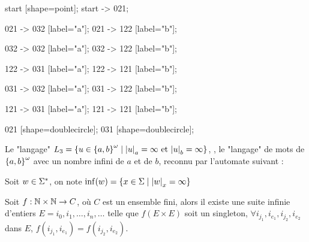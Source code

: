 \begin{exemple}
\begin{itemize}
\begin{automata}
{				      start [shape=point];
				      start -> 021;

				      021 -> 032 [label="a"];
				      021 -> 122 [label="b"];

				      032 -> 032 [label="a"];
				      032 -> 122 [label="b"];


				      122 -> 031 [label="a"];
				      122 -> 121 [label="b"];


				      031 -> 032 [label="a"];
				      031 -> 122 [label="b"];

				      121 -> 031 [label="a"];
				      121 -> 121 [label="b"];

				      021 [shape=doublecircle];
				      031 [shape=doublecircle];
			      }
		      \end{automata}
	\end{itemize}
\end{exemple}

\begin{remarque}
	Le "langage" $L_3 = \left\{u \in {\left\{a,b\right\}}^{\omega} \mid {\left|u\right|}_a = \infty \text{ et } {\left|u\right|}_b = \infty\right\}$, \ie,
	le "langage" de mots de ${\left\{a,b\right\}}^{\omega}$ avec un nombre infini de $a$ et de $b$, reconnu par l'automate suivant :

	\begin{automata}
	\end{automata}
\end{remarque}

\begin{notation}
	Soit $w \in \Sigma^{*}$, on note $\inf (w) = \left\{x \in \Sigma \mid {\left|w\right|}_x = \infty\right\}$
\end{notation}

\begin{theorem}
	Soit $f : \mathbb{N} \times \mathbb{N} \to C $, où $C$ est un ensemble fini, alors il existe une suite infinie d'entiers $E = i_0, i_1, \ldots, i_n, \ldots$
	telle que $f(E \times E)$ soit un singleton, \ie $\forall i_{j_1},i_{e_1},i_{j_2},i_{e_2}$ dans $E$, $f(i_{j_1},i_{e_1})=f(i_{j_2},i_{e_2})$.
\end{theorem}


